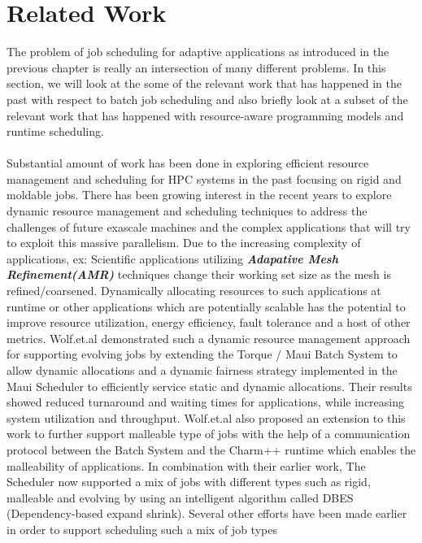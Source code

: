 \chapter{Related Work}\label{chapter:related work}
The problem of job scheduling for adaptive applications as introduced in the previous chapter is really an intersection of many different problems. In this section, we will look at the some of the relevant work that has happened in the past with respect to batch job scheduling and also briefly look at a subset of the relevant work that has happened with resource-aware programming models and runtime scheduling.\\ \\
Substantial amount of work has been done in exploring efficient resource management and scheduling for HPC systems in the past focusing on rigid and moldable jobs. There has been growing interest in the recent years to explore dynamic resource management and scheduling techniques to address the challenges of future exascale machines and the complex applications that will try to exploit this massive parallelism. Due to the increasing complexity of applications, ex: Scientific applications utilizing \textbf{\textit{Adapative Mesh Refinement(AMR)}} techniques change their working set size as the mesh is refined/coarsened. Dynamically allocating resources to such applications at runtime or other applications which are potentially scalable has the potential to improve resource utilization, energy efficiency, fault tolerance\cite{vadhiyar} and a host of other metrics\cite{abhishek}\cite{osman}. Wolf.et.al\cite{felix} demonstrated such a dynamic resource management approach for supporting evolving jobs by extending the Torque / Maui Batch System to allow dynamic allocations and a dynamic fairness strategy implemented in the Maui Scheduler to efficiently service static and dynamic allocations. Their results showed reduced turnaround and waiting times for applications, while increasing system utilization and throughput. Wolf.et.al\cite{laxmikant} also proposed an extension to this work to further support malleable type of jobs with the help of a communication protocol between the Batch System and the Charm++ runtime which enables the malleability of applications. In combination with their earlier work, The Scheduler now supported a mix of jobs with different types such as rigid, malleable and evolving by using an intelligent algorithm called DBES (Dependency-based expand shrink). Several other efforts have been made earlier in order to support scheduling such a mix of job types\cite{hungershofer}\cite{jamjoom}\\ \\
